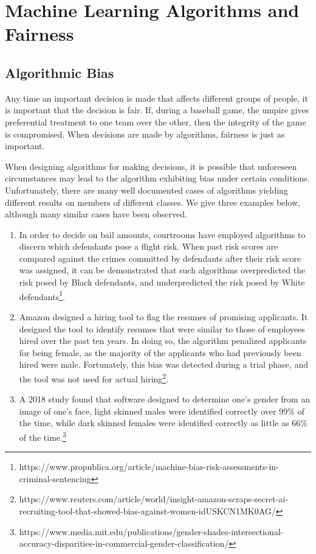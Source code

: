 \section{Machine Learning Algorithms and Fairness}

\subsection{Algorithmic Bias}
\par Any time an important decision is made that affects different groups of people, it is important that the decision is fair. If, during a baseball game, the umpire gives preferential treatment to one team over the other, then the integrity of the game is compromised. When decisions are made by algorithms, fairness is just as important. 

\par When designing algorithms for making decisions, it is possible that unforeseen circumstances may lead to the algorithm exhibiting bias under certain conditions. Unfortunately, there are many well documented cases of algorithms yielding different results on members of different classes. We give three examples below, although many similar cases have been observed.
\begin{enumerate}
    \item In order to decide on bail amounts, courtrooms have employed algorithms to discern which defendants pose a flight risk. When past risk scores are compared against the crimes committed by defendants after their risk score was assigned, it can be demonstrated that such algorithms overpredicted the risk posed by Black defendants, and underpredicted the risk posed by White defendants\footnote{https://www.propublica.org/article/machine-bias-risk-assessments-in-criminal-sentencing}.
    \item Amazon designed a hiring tool to flag the resumes of promising applicants. It designed the tool to identify resumes that were similar to those of employees hired over the past ten years. In doing so, the algorithm penalized applicants for being female, as the majority of the applicants who had previously been hired were male. Fortunately, this bias was detected during a trial phase, and the tool was not used for actual hiring\footnote{https://www.reuters.com/article/world/insight-amazon-scraps-secret-ai-recruiting-tool-that-showed-bias-against-women-idUSKCN1MK0AG/}.
    \item A 2018 study found that software designed to determine one’s gender from an image of one’s face, light skinned males were identified correctly over 99\% of the time, while dark skinned females were identified correctly as little as 66\% of the time.\footnote{https://www.media.mit.edu/publications/gender-shades-intersectional-accuracy-disparities-in-commercial-gender-classification/}
\end{enumerate}


